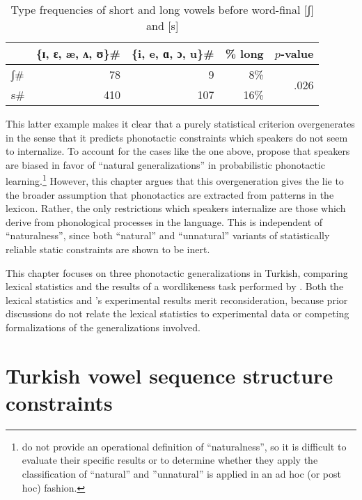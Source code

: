 \begin{table}[t]
\centering
\begin{tabular}{l r r r r}
\toprule
          & \{ɪ, ɛ, æ, ʌ, ʊ\}\gap{}\# & \{i, e, ɑ, ɔ, u\}\gap{}\# & \% long & $p$-value \\
\midrule
\gap{}ʃ\# & 78                & 9                 & 8\%      & \multirow{2}{*}{.026} \\
\gap{}s\# & 410               & 107               & 16\%     & \\
\bottomrule
\end{tabular}
\caption{Type frequencies of short and long vowels before word-final [ʃ] and [s]}
\label{ssh}
\end{table}

This latter example makes it clear that a purely statistical criterion overgenerates in the sense that it predicts phonotactic constraints which speakers do not seem to internalize.
To account for the cases like the one above, \citet{HayesInPress} propose that speakers are biased in favor of ``natural generalizations'' in probabilistic phonotactic learning.\footnote{
    \citeauthor{HayesInPress} do not provide an operational definition of ``naturalness'', so it is difficult to evaluate their specific results or to determine whether they apply the classification of ``natural'' and ''unnatural'' is applied in an ad hoc (or post hoc) fashion.}
However, this chapter argues that this overgeneration gives the lie to the broader assumption that phonotactics are extracted from patterns in the lexicon.
Rather, the only restrictions which speakers internalize are those which derive from phonological processes in the language.
This is independent of ``naturalness'', since both ``natural'' and ``unnatural'' variants of statistically reliable static constraints are shown to be inert.

This chapter focuses on three phonotactic generalizations in Turkish, comparing lexical statistics and the results of a wordlikeness task performed by \citet{Zimmer1969}. 
Both the lexical statistics and \citeauthor{Zimmer1969}'s experimental results merit reconsideration, because prior discussions do not relate the lexical statistics to experimental data or competing formalizations of the generalizations involved.

\section{Turkish vowel sequence structure constraints}

